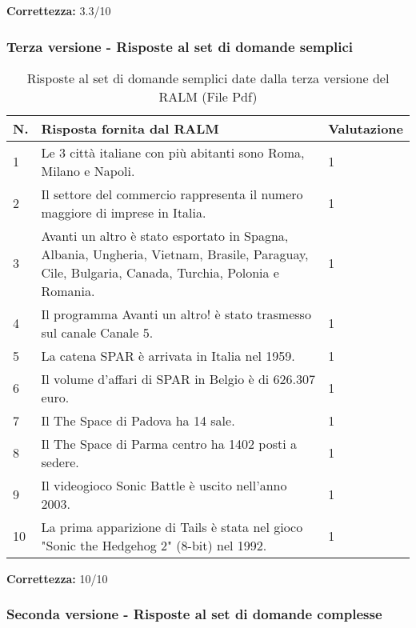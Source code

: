 \textbf{Correttezza:} 3.3/10

\subsubsection{Terza versione - Risposte al set di domande semplici}

\begin{table}[H]
    \centering
    \begin{tabular}{|p{0.5cm} |p{6cm} |p{2cm}|}
        \hline
        \textbf{N}. & \textbf{Risposta fornita dal RALM} & \textbf{Valutazione} \\
        \hline
        1 & Le 3 città italiane con più abitanti sono Roma, Milano e Napoli. & 1 \\
        \hline
        2 & Il settore del commercio rappresenta il numero maggiore di imprese in Italia. & 1 \\
        \hline
        3 & Avanti un altro è stato esportato in Spagna, Albania, Ungheria, Vietnam, Brasile, Paraguay, Cile, Bulgaria, Canada, Turchia, Polonia e Romania. & 1 \\
        \hline
        4 & Il programma Avanti un altro! è stato trasmesso sul canale Canale 5. & 1 \\
        \hline
        5 & La catena SPAR è arrivata in Italia nel 1959. & 1 \\
        \hline
        6 & Il volume d'affari di SPAR in Belgio è di 626.307 euro. & 1 \\
        \hline
        7 & Il The Space di Padova ha 14 sale. & 1 \\
        \hline
        8 & Il The Space di Parma centro ha 1402 posti a sedere. & 1 \\
        \hline
        9 & Il videogioco Sonic Battle è uscito nell'anno 2003. & 1 \\
        \hline
        10 & La prima apparizione di Tails è stata nel gioco "Sonic the Hedgehog 2" (8-bit) nel 1992. & 1 \\
        \hline
    \end{tabular}
    \caption{Risposte al set di domande semplici date dalla terza versione del RALM (File Pdf)}
\end{table}

\textbf{Correttezza:} 10/10

\subsubsection{Seconda versione - Risposte al set di domande complesse}

